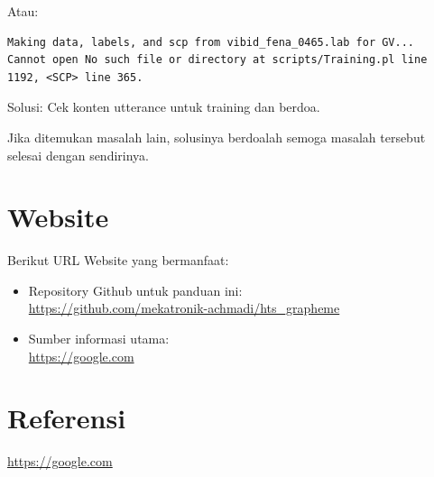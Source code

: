 \documentclass[12pt,]{article}
\begin{document}
\begin{itemize}
		Atau:
		\begin{verbatim}
Making data, labels, and scp from vibid_fena_0465.lab for GV...
Cannot open No such file or directory at scripts/Training.pl line 1192, <SCP> line 365.
		\end{verbatim}

		Solusi: Cek konten utterance untuk training dan berdoa.
		
	\end{itemize}
	
	Jika ditemukan masalah lain, solusinya berdoalah semoga masalah tersebut selesai dengan sendirinya.
	
	\newpage
	\mbox{}
	
	\newpage
	\section{Website}
	
	Berikut URL Website yang bermanfaat:
	\begin{itemize}
		\item Repository Github untuk panduan ini:\\
		\url{https://github.com/mekatronik-achmadi/hts_grapheme}
		
		\item Sumber informasi utama:\\
		\url{https://google.com}
		
	\end{itemize}

	\newpage
	\mbox{}
	
	\newpage
	\section{Referensi}
	
	\url{https://google.com}
	
	\newpage
	\mbox{}
	
\end{document}
